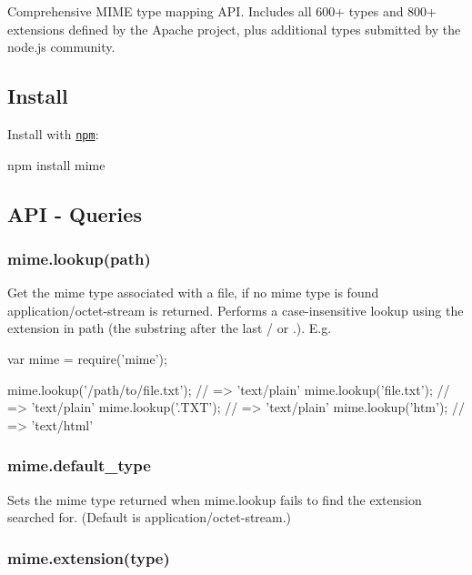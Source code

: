 Comprehensive M\+I\+M\+E type mapping A\+P\+I. Includes all 600+ types and 800+ extensions defined by the Apache project, plus additional types submitted by the node.\+js community.

\subsection*{Install}

Install with \href{http://github.com/isaacs/npm}{\tt npm}\+: \begin{DoxyVerb}npm install mime
\end{DoxyVerb}


\subsection*{A\+P\+I -\/ Queries}

\subsubsection*{mime.\+lookup(path)}

Get the mime type associated with a file, if no mime type is found {\ttfamily application/octet-\/stream} is returned. Performs a case-\/insensitive lookup using the extension in {\ttfamily path} (the substring after the last \textquotesingle{}/\textquotesingle{} or \textquotesingle{}.\textquotesingle{}). E.\+g. \begin{DoxyVerb}var mime = require('mime');

mime.lookup('/path/to/file.txt');         // => 'text/plain'
mime.lookup('file.txt');                  // => 'text/plain'
mime.lookup('.TXT');                      // => 'text/plain'
mime.lookup('htm');                       // => 'text/html'
\end{DoxyVerb}


\subsubsection*{mime.\+default\+\_\+type}

Sets the mime type returned when {\ttfamily mime.\+lookup} fails to find the extension searched for. (Default is {\ttfamily application/octet-\/stream}.)

\subsubsection*{mime.\+extension(type)}

